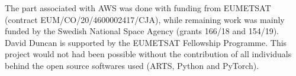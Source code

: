 \documentclass[amt, manuscript]{copernicus}
\begin{document}



\appendixfigures  %

\appendixtables   %








\begin{acknowledgements}
The part associated with AWS was done with funding from EUMETSAT (contract  EUM/CO/20/4600002417/CJA), while remaining work was mainly funded by the Swedish National Space Agency (grants 166/18 and 154/19). David Duncan is supported by the EUMETSAT Fellowship Programme.
This project would not had been possible without the contribution of all individuals behind the open source softwares used (ARTS, Python and PyTorch).
\end{acknowledgements}






 
 
\end{document}
